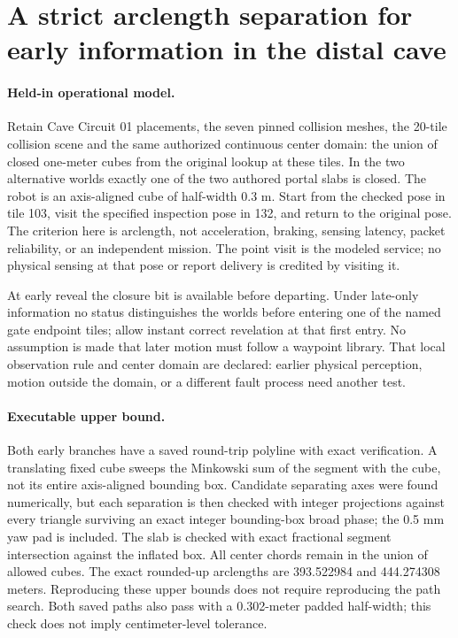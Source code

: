 \documentclass{article}
\begin{document}
\section*{A strict arclength separation for early information in the distal cave}
\paragraph{Held-in operational model.}
Retain Cave Circuit 01 placements, the seven pinned collision
meshes, the 20-tile collision scene and the same authorized
continuous center domain: the union of closed one-meter cubes
from the original lookup at these tiles. In the two alternative
worlds exactly one of the two authored portal slabs is closed.
The robot is an axis-aligned cube of half-width 0.3 m.
Start from the checked pose in tile 103, visit the specified
inspection pose in 132, and return to the original pose. The
criterion here is arclength, not acceleration, braking, sensing
latency, packet reliability, or an independent mission. The
point visit is the modeled service; no physical sensing at that
pose or report delivery is credited by visiting it.

At early reveal the closure bit is available before departing.
Under late-only information no status distinguishes the worlds
before entering one of the named gate endpoint tiles; allow
instant correct revelation at that first entry. No assumption
is made that later motion must follow a waypoint library.
That local observation rule and center domain are declared:
earlier physical perception, motion outside the domain, or a
different fault process need another test.

\paragraph{Executable upper bound.}
Both early branches have a saved round-trip polyline with
exact verification. A translating fixed cube sweeps the
Minkowski sum of the segment with the cube, not its entire
axis-aligned bounding box. Candidate separating axes were
found numerically, but each separation is then checked with
integer projections against every triangle surviving an
exact integer bounding-box broad phase; the 0.5 mm yaw pad
is included. The slab is checked with exact fractional segment
intersection against the inflated box. All center chords
remain in the union of allowed cubes. The exact rounded-up
arclengths are 393.522984 and 444.274308 meters. Reproducing
these upper bounds does not require reproducing the path search.
Both saved paths also pass with a 0.302-meter padded half-width;
this check does not imply centimeter-level tolerance.
\end{document}
